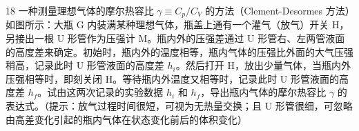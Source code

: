 \begin{problem}{18}
一种测量理想气体的摩尔热容比 $\gamma \equiv C_p / C_V$ 的方法（Clement-Desormes 方法）如图所示：大瓶 G 内装满某种理想气体，瓶盖上通有一个灌气（放气）开关 H，另接出一根 U 形管作为压强计 M。瓶内外的压强差通过 U 形管右、左两管液面的高度差来确定。初始时，瓶内外的温度相等，瓶内气体的压强比外面的大气压强稍高，记录此时 U 形管液面的高度差 $h_i$。然后打开 H，放出少量气体，当瓶内外压强相等时，即刻关闭 H。等待瓶内外温度又相等时，记录此时 U 形管液面的高度差 $h_f$。试由这两次记录的实验数据 $h_i$ 和 $h_f$，导出瓶内气体的摩尔热容比 $\gamma$ 的表达式。（提示：放气过程时间很短，可视为无热量交换；且 U 形管很细，可忽略由高差变化引起的瓶内气体在状态变化前后的体积变化）
\end{problem}